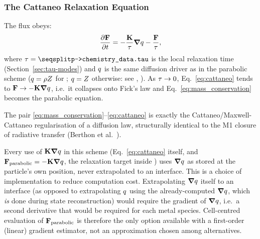 \subsubsection{The Cattaneo Relaxation Equation}
The flux obeys:
\begin{equation}
  \label{eq:cattaneo}
  \pdv{\mathbf{F}}{t} = - \frac{\mathbf{K}}{\tau}\grad q - \frac{\mathbf{F}}{\tau} ,
\end{equation}
where $\taurelax = \code{p->chemistry\_data.tau}$ is the local relaxation
time (Section~\ref{sec:tau-modes}) and $q$ is the same diffusion
driver as in the parabolic scheme ($q=\rho Z$ for
; $q=Z$ otherwise: see
, ).
As $\tau\to0$, Eq.~\eqref{eq:cattaneo} tends to
$\mathbf{F}\to-\mathbf{K}\grad q$, i.e.\ it collapses onto Fick's law and
Eq.~\eqref{eq:mass_conservation} becomes the parabolic equation.

The pair \eqref{eq:mass_conservation}--\eqref{eq:cattaneo} is exactly the
Cattaneo/Maxwell-Cattaneo regularisation of a diffusion law, structurally
identical to the M1 closure of radiative transfer
(Berthon et al.~\citeyear{Berthon2007}).

\begin{remark}
\label{rem:cell-centred-gradients-only}
Every use of $\mathbf{K}\grad q$ in this scheme (Eq.~\eqref{eq:cattaneo}
itself, and $\mathbf{F}_{\rm parabolic}=-\mathbf{K}\grad q$, the relaxation
target inside ) uses
$\grad q$ as stored at the particle's own position, never
extrapolated to an interface. This is a choice of implementation to reduce computation cost. Extrapolating
$\grad q$ itself to an interface (as opposed to extrapolating
$q$ using the already-computed $\grad q$, which \emph{is} done
during state reconstruction) would require the gradient of
$\grad q$, i.e.\ a second derivative that would be required for each metal species.
Cell-centred evaluation of $\mathbf{F}_{\rm parabolic}$ is therefore the only
option available with a first-order (linear) gradient estimator, not an
approximation chosen among alternatives.
\end{remark}

